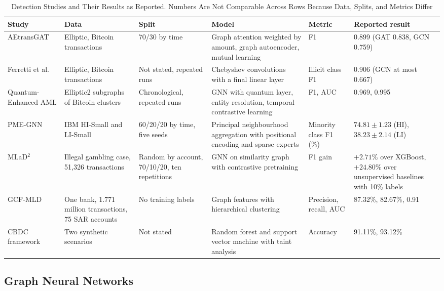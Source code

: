 \documentclass[journal]{IEEEtran}
\begin{document}
\begin{table}[!t]
\centering
\caption{Detection Studies and Their Results as Reported. Numbers Are Not Comparable Across Rows Because Data, Splits, and Metrics Differ}
\label{tab:detection}
\footnotesize
\begin{tabularx}{\textwidth}{@{}L{1.9cm}L{3.1cm}L{2.35cm}YL{1.75cm}L{3.3cm}@{}}
\toprule
\textbf{Study} & \textbf{Data} & \textbf{Split} & \textbf{Model} & \textbf{Metric} & \textbf{Reported result}\\
\midrule
AEtransGAT \cite{yu2023aetransgat} & Elliptic, Bitcoin transactions & 70/30 by time & Graph attention weighted by amount, graph autoencoder, mutual learning & F1 & 0.899 (GAT 0.838, GCN 0.759)\\
Ferretti et al. \cite{ferretti2025gnn} & Elliptic, Bitcoin transactions & Not stated, repeated runs & Chebyshev convolutions with a final linear layer & Illicit class F1 & 0.906 (GCN at most 0.667)\\
Quantum-Enhanced AML \cite{nayak2026quantum} & Elliptic2 subgraphs of Bitcoin clusters & Chronological, repeated runs & GNN with quantum layer, entity resolution, temporal contrastive learning & F1, AUC & 0.969, 0.995\\
PME-GNN \cite{mao2026pmegnn} & IBM HI-Small and LI-Small & 60/20/20 by time, five seeds & Principal neighbourhood aggregation with positional encoding and sparse experts & Minority class F1 (\%) & $74.81\pm1.23$ (HI), $38.23\pm2.14$ (LI)\\
MLaD$^2$ \cite{luo2024mlad} & Illegal gambling case, 51{,}326 transactions & Random by account, 70/10/20, ten repetitions & GNN on similarity graph with contrastive pretraining & F1 gain & $+2.71\%$ over XGBoost, $+24.80\%$ over unsupervised baselines with 10\% labels\\
GCF-MLD \cite{irshad2024gcfmld} & One bank, 1.771 million transactions, 75 SAR accounts & No training labels & Graph features with hierarchical clustering & Precision, recall, AUC & 87.32\%, 82.67\%, 0.91\\
CBDC framework \cite{amber2026cbdc} & Two synthetic scenarios & Not stated & Random forest and support vector machine with taint analysis & Accuracy & 91.11\%, 93.12\%\\
\bottomrule
\end{tabularx}
\end{table}

\subsection{Graph Neural Networks}
\end{document}

